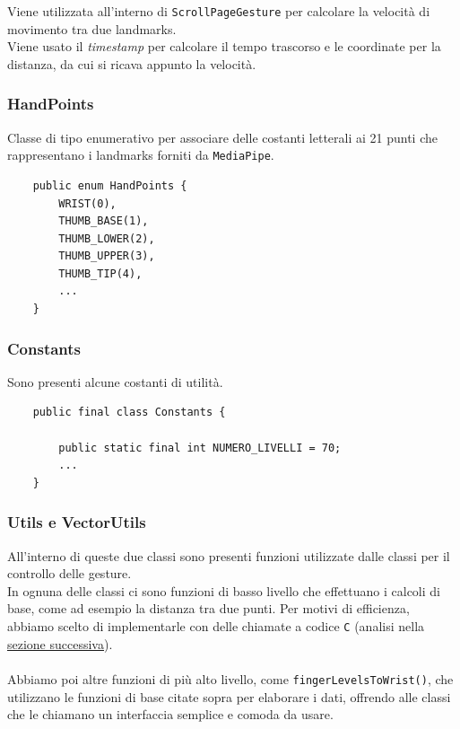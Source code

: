 \noindent Viene utilizzata all'interno di \texttt{ScrollPageGesture} per calcolare la velocità di movimento tra due landmarks.\\
Viene usato il \textit{timestamp} per calcolare il tempo trascorso e le coordinate per la distanza, da cui si ricava appunto la velocità.

\newpage
\subsubsection{HandPoints}
Classe di tipo enumerativo per associare delle costanti letterali ai 21 punti che rappresentano i landmarks forniti da \texttt{MediaPipe}.
\begin{verbatim}
    public enum HandPoints {
        WRIST(0),
        THUMB_BASE(1),
        THUMB_LOWER(2),
        THUMB_UPPER(3),
        THUMB_TIP(4),
        ...
    }
\end{verbatim}

\subsubsection{Constants}
Sono presenti alcune costanti di utilità.
\begin{verbatim}
    public final class Constants {

        public static final int NUMERO_LIVELLI = 70;
        ...
    }
\end{verbatim}

\subsubsection{Utils e VectorUtils}
All'interno di queste due classi sono presenti funzioni utilizzate dalle classi per il controllo delle gesture.\\
In ognuna delle classi ci sono funzioni di basso livello che effettuano i calcoli di base, come ad esempio la distanza tra due punti. Per motivi di efficienza, abbiamo scelto di implementarle con delle chiamate a codice \texttt{C} (analisi nella \hyperref[chap:cpp]{\underline{sezione successiva}}).\\
\\
\noindent Abbiamo poi altre funzioni di più alto livello, come \texttt{fingerLevelsToWrist()}, che utilizzano le funzioni di base citate sopra per elaborare i dati, offrendo alle classi che le chiamano un interfaccia semplice e comoda da usare.

